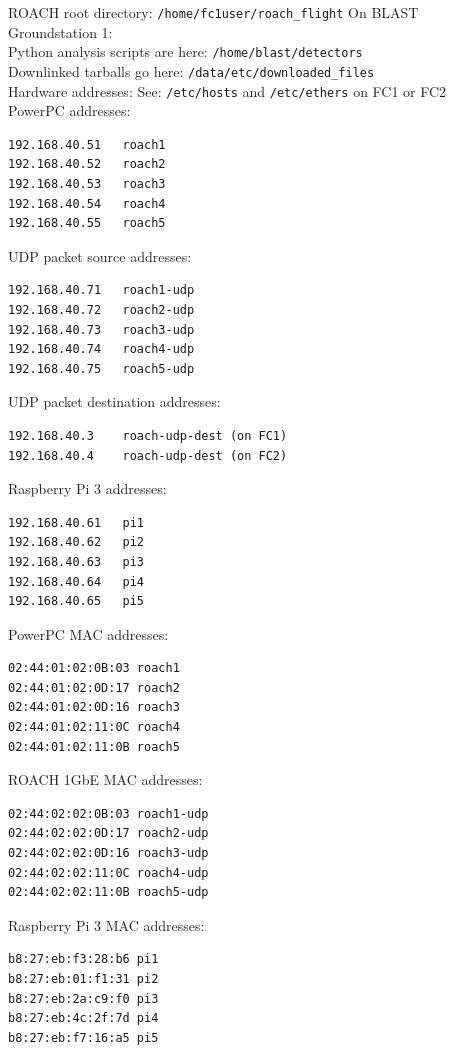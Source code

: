 ROACH root directory: \texttt{/home/fc1user/roach\_flight}\newline\newline
On BLAST Groundstation 1:\\

Python analysis scripts are here: \texttt{/home/blast/detectors}\\

Downlinked tarballs go here: \texttt{/data/etc/downloaded\_files}\\

\noindent Hardware addresses:
See: \texttt{/etc/hosts} and \texttt{/etc/ethers} on FC1 or FC2\\
PowerPC addresses:

\begin{verbatim}
192.168.40.51	roach1
192.168.40.52	roach2
192.168.40.53	roach3
192.168.40.54	roach4
192.168.40.55	roach5
\end{verbatim}

\noindent UDP packet source addresses:

\begin{verbatim}
192.168.40.71	roach1-udp
192.168.40.72	roach2-udp
192.168.40.73	roach3-udp
192.168.40.74	roach4-udp
192.168.40.75	roach5-udp
\end{verbatim}

\noindent UDP packet destination addresses:
\begin{verbatim}
192.168.40.3	roach-udp-dest (on FC1)
192.168.40.4	roach-udp-dest (on FC2)
\end{verbatim}

\noindent Raspberry Pi 3 addresses:
\begin{verbatim}
192.168.40.61	pi1
192.168.40.62	pi2
192.168.40.63	pi3
192.168.40.64	pi4
192.168.40.65	pi5
\end{verbatim}

\noindent PowerPC MAC addresses:
\begin{verbatim}
02:44:01:02:0B:03 roach1
02:44:01:02:0D:17 roach2
02:44:01:02:0D:16 roach3
02:44:01:02:11:0C roach4
02:44:01:02:11:0B roach5
\end{verbatim}

\noindent ROACH 1GbE MAC addresses:
\begin{verbatim}
02:44:02:02:0B:03 roach1-udp
02:44:02:02:0D:17 roach2-udp
02:44:02:02:0D:16 roach3-udp
02:44:02:02:11:0C roach4-udp
02:44:02:02:11:0B roach5-udp
\end{verbatim}

\noindent Raspberry Pi 3 MAC addresses:
\begin{verbatim}
b8:27:eb:f3:28:b6 pi1
b8:27:eb:01:f1:31 pi2
b8:27:eb:2a:c9:f0 pi3
b8:27:eb:4c:2f:7d pi4
b8:27:eb:f7:16:a5 pi5
\end{verbatim}

